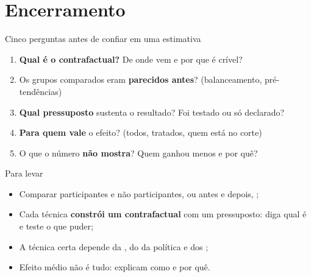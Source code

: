 \section[Fim]{Encerramento}

\begin{frame}{Cinco perguntas antes de confiar em uma estimativa}
  \begin{enumerate}
    \item \textbf{Qual é o contrafactual?} De onde vem e por que é crível?
    \item Os grupos comparados eram \textbf{parecidos antes}? (balanceamento, pré-tendências)
    \item \textbf{Qual pressuposto} sustenta o resultado? Foi testado ou só declarado?
    \item \textbf{Para quem vale} o efeito? (todos, tratados, quem está no corte)
    \item O que o número \textbf{não mostra}? Quem ganhou menos e por quê?
  \end{enumerate}
\end{frame}

\begin{frame}{Para levar}
  \begin{itemize}
    \item Comparar participantes e não participantes, ou antes e depois, ;
    \item Cada técnica \textbf{constrói um contrafactual} com um pressuposto: diga qual é e teste o que puder;
    \item A técnica certa depende da , do  da política e dos ;
    \item Efeito médio não é tudo:  explicam como e por quê.
  \end{itemize}
\end{frame}


